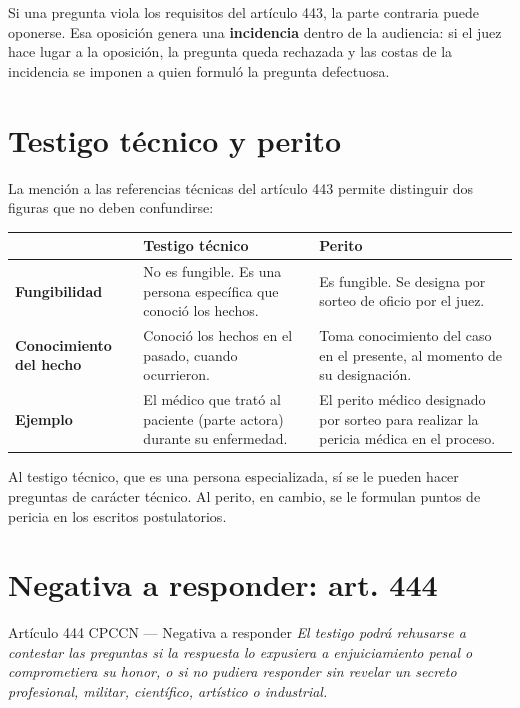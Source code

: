 \documentclass[12pt,oneside]{book}
\renewcommand{\arraystretch}{1.15}
\begin{document}
Si una pregunta viola los requisitos del artículo 443, la parte contraria puede oponerse. Esa oposición genera una \textbf{incidencia} dentro de la audiencia: si el juez hace lugar a la oposición, la pregunta queda rechazada y las costas de la incidencia se imponen a quien formuló la pregunta defectuosa.

\section{Testigo técnico y perito}

La mención a las referencias técnicas del artículo 443 permite distinguir dos figuras que no deben confundirse:

\begin{center}
\renewcommand{\arraystretch}{1.3}
\begin{tabularx}{\textwidth}{
    >{\raggedright\arraybackslash}p{}
    >{\raggedright\arraybackslash}X
    >{\raggedright\arraybackslash}X}
\toprule
 & \textbf{Testigo técnico} & \textbf{Perito} \\
\midrule
\textbf{Fungibilidad} & No es fungible. Es una persona específica que conoció los hechos. & Es fungible. Se designa por sorteo de oficio por el juez. \\
\addlinespace
\textbf{Conocimiento del hecho} & Conoció los hechos en el pasado, cuando ocurrieron. & Toma conocimiento del caso en el presente, al momento de su designación. \\
\addlinespace
\textbf{Ejemplo} & El médico que trató al paciente (parte actora) durante su enfermedad. & El perito médico designado por sorteo para realizar la pericia médica en el proceso. \\
\bottomrule
\end{tabularx}
\end{center}

Al testigo técnico, que es una persona especializada, sí se le pueden hacer preguntas de carácter técnico. Al perito, en cambio, se le formulan puntos de pericia en los escritos postulatorios.

\section{Negativa a responder: art. 444}

\begin{norma}{Artículo 444 CPCCN --- Negativa a responder}
\textit{El testigo podrá rehusarse a contestar las preguntas si la respuesta lo expusiera a enjuiciamiento penal o comprometiera su honor, o si no pudiera responder sin revelar un secreto profesional, militar, científico, artístico o industrial.}
\end{norma}
\end{document}
